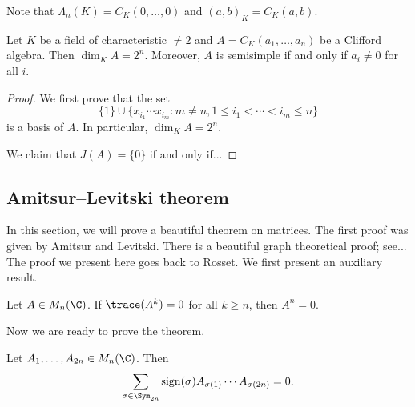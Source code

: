 Note that $\Lambda_n(K)=C_K(0,\dots,0)$ and 
$(a,b)_K=C_K(a,b)$. 

\begin{theorem}
    Let $K$ be a field of characteristic $\ne2$ and 
    $A=C_K(a_1,\dots,a_n)$ be a Clifford algebra. 
    Then $\dim_KA=2^n$. Moreover, $A$ is semisimple if and only if $a_i\ne0$ for all $i$. 
\end{theorem}

\begin{proof}
    We first prove that the set
    \[
    \{1\}\cup \{x_{i_1}\cdots x_{i_m}:m\neq n,1\leq i_1<\cdots<i_m\leq n\}
    \]
    is a basis of $A$. In particular, $\dim_KA=2^n$.

    We claim that $J(A)=\{0\}$ if and only if... 
\end{proof}

\subsection{Amitsur--Levitski theorem}

In this section, we will prove a beautiful theorem 
on matrices. The first proof was given by Amitsur and Levitski. 
There is a beautiful graph theoretical proof; see...
The proof we present here goes back to Rosset. We first present 
an auxiliary result. 

\begin{exercise}
    \label{xca:traces}
    Let $A\in M_n(\C)$. If $\trace(A^k)=0$ for all $k\geq n$, then 
    $A^n=0$. 
\end{exercise}

Now we are ready to prove the theorem. 

\begin{theorem}
    \label{thm:AmitsurLevitski}
    Let $A_1,\dots,A_{2n}\in M_n(\C)$. Then 
    \[
    \sum_{\sigma\in\Sym_{2n}}\operatorname{sign}(\sigma)A_{\sigma(1)}\cdots A_{\sigma(2n)}=0.
    \]
\end{theorem}

